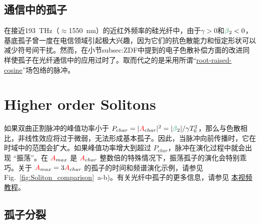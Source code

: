 \subsection{通信中的孤子}
在接近193~THz（$\approx$1550~nm）的近红外频率的硅光纤中，由于$\gamma>0$和$\betag_2<0$，基底孤子曾一度在电信领域引起极大兴趣，因为它们的抗色散能力和恒定形状可以减少符号间干扰。然而，在小节{subsec:ZDF}中提到的电子色散补偿方面的改进同样使孤子在光纤通信中的应用过时了。取而代之的是采用所谓“\href{https://www.youtube.com/watch?v=hCk_cg-OfUQ}{root-raised-cosine}”场包络的脉冲。  

\section{Higher order Solitons}
如果双曲正割脉冲的峰值功率小于 $P_{char}=|\A_{char}|^2=|\betag_2|/\gamma T_0^2$，那么与色散相比，非线性效应将过于微弱，无法形成基本孤子。因此，当脉冲向前传播时，它在时域中的范围会扩大。如果峰值功率增大到超过 $P_{char}$，脉冲在演化过程中就会出现 “振荡”。在 $\textcolor{red}{A}_{max}$ 是 $\textcolor{red}{A}_{char}$ 整数倍的特殊情况下，振荡孤子的演化会特别乖巧。关于 $\textcolor{red}{A}_{max}=3\textcolor{red}{A}_{char}$ 的孤子的时间和频谱演化示例，请参见 Fig.~\ref{fig:Soliton_comparison}~a-b)。有关光纤中孤子的更多信息，请参见 \href{https://youtu.be/KAZ7pCQ-x8Y}{本视频教程}。
\subsection{孤子分裂}
\label{subsec:fission}

